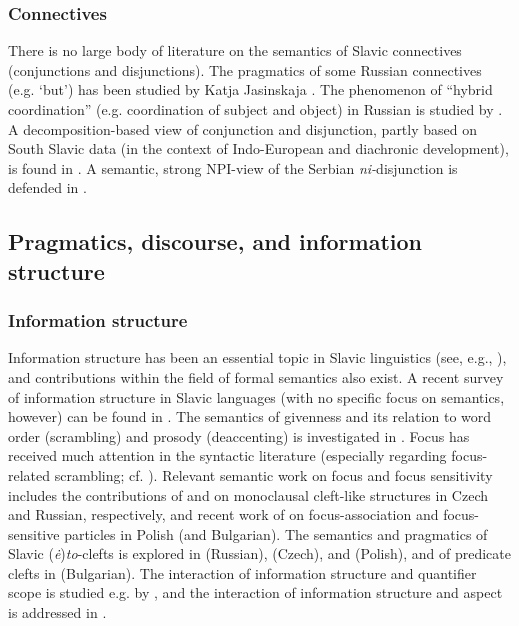 \documentclass[output=paper,colorlinks,citecolor=brown]{langscibook}
\begin{document}
\subsubsection{Connectives} There is no large body of literature on the semantics of Slavic connectives (conjunctions and disjunctions). The pragmatics of some Russian connectives (e.g. `but') has been studied by Katja Jasinskaja \citep{Jasinskaja.Zeevat2008,jasinskaja-zeevat09,jasinskaja10}. The phenomenon of ``hybrid coordination'' (e.g. coordination of subject and object) in Russian is studied by \citet{paperno12}. A decomposition-based view of conjunction and disjunction, partly based on South Slavic data (in the context of Indo-European and diachronic development), is found in \citet{mitrovic-sauerland14}. A semantic, strong NPI-view of the Serbian \textit{ni-}disjunction is defended in \citet{gajic16,gajic18,gajic_2022}.

\subsection{Pragmatics, discourse, and information structure}

\subsubsection{Information structure} Information structure has been an essential topic in Slavic linguistics (see, e.g., \citealt{Junghanns2002}), and contributions within the field of formal semantics also exist. A recent survey of information structure in Slavic languages (with no specific focus on semantics, however) can be found in \citet{jasinskaja16}. The semantics of givenness and its relation to word order (scrambling) and prosody (deaccenting) is investigated in \citet{kucerova07,kucerova12,simikwierzba15}. Focus has received much attention in the syntactic literature (especially regarding focus-related scrambling; cf. \citealt{boskovic09a}). Relevant semantic work on focus and focus sensitivity includes the contributions of \citet{simik09c} and \citet{kimmelman09} on monoclausal cleft-like structures in Czech and Russian, respectively, and recent work of \citet{tomaszewicz13,tomaszewicz13a,tomaszewicz15} on focus-association and focus-sensitive particles in Polish (and Bulgarian). The semantics and pragmatics of Slavic (\textit{\.{e}})\textit{to}-clefts is explored in \citet{kimmelman09,Yerbalanov.philippova2023,Shipova2023} (Russian), \citet{simik09c} (Czech), and \citet{Tajsner2018} (Polish), and of predicate clefts in \citet{karagjosova+15} (Bulgarian). The interaction of information structure and quantifier scope is studied e.g. by \citet{ionin-luchkina18}, and the interaction of information structure and aspect is addressed in \citet{gronndiss,alvestad14,Borik.Gehrke2018}.
\end{document}

